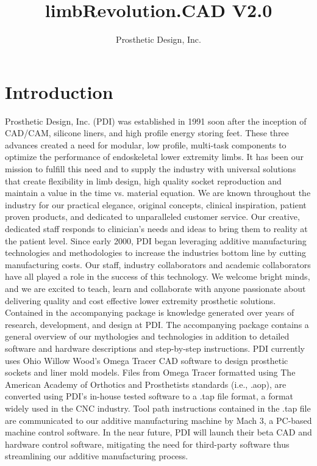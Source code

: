 \documentclass[twoside,a4paper]{refrep}
\title{limbRevolution.CAD V2.0}
\author{Prosthetic Design, Inc.}
\date{}
\begin{document}
	\maketitle
	\tableofcontents
	\newpage
	
	\section{Introduction}
	Prosthetic Design, Inc. (PDI) was established in 1991 soon after the inception of CAD/CAM, silicone liners, and high profile energy storing feet. These three advances created a need for modular, low profile, multi-task components to optimize the performance of endoskeletal lower extremity limbs. It has been our mission to fulfill this need and to supply the industry with universal solutions that create flexibility in limb design, high quality socket reproduction and maintain a value in the time vs. material equation.
	We are known throughout the industry for our practical elegance, original concepts, clinical inspiration, patient proven products, and dedicated to unparalleled customer service. Our creative, dedicated staff responds to clinician’s needs and ideas to bring them to reality at the patient level.
	Since early 2000, PDI began leveraging additive manufacturing technologies and methodologies to increase the industries bottom line by cutting manufacturing costs. Our staff, industry collaborators and academic collaborators have all played a role in the success of this technology. We welcome bright minds, and we are excited to teach, learn and collaborate with anyone passionate about delivering quality and cost effective lower extremity prosthetic solutions.
	Contained in the accompanying package is knowledge generated over years of research, development, and design at PDI. The accompanying package contains a general overview of our mythologies and technologies in addition to detailed software and hardware descriptions and step-by-step instructions.
	PDI currently uses Ohio Willow Wood’s Omega Tracer CAD software to design prosthetic sockets and liner mold models. Files from Omega Tracer formatted using The American Academy of Orthotics and Prosthetists standards (i.e., .aop), are converted using PDI’s in-house tested software to a .tap file format, a format widely used in the CNC industry. Tool path instructions contained in the .tap file are communicated to our additive manufacturing machine by Mach 3, a PC-based machine control software. In the near future, PDI will launch their beta CAD and hardware control software, mitigating the need for third-party software thus streamlining our additive manufacturing process.
\end{document}

